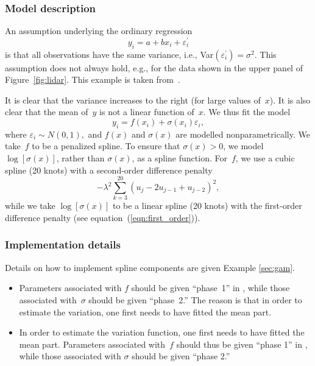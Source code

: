 \documentclass{admbmanual}
\newcommand{\citeasnoun}{\cite}
\begin{document}
\subsubsection{Model description}
An assumption underlying the ordinary regression 
\[
y_{i}=a+bx_{i}+\varepsilon _{i}^{\prime }
\]
is that all observations have the same variance, 
i.e., Var$\left( \varepsilon_{i}^{\prime }\right) =\sigma^{2}$. 
This assumption does not always hold,
e.g., for the data shown in the upper panel of Figure~\ref{fig:lidar}. 
This example is taken from~\citeasnoun{rupp:wand:carr:2003}.

It is clear that the variance increases to the right (for large values of~$x$). It is also clear
that the mean of~$y$ is not a linear function of~$x$. We thus fit the model
\[
y_{i}=f(x_{i})+\sigma (x_{i})\varepsilon _{i},
\]
where $\varepsilon _{i}\sim N(0,1),$ and $f(x)$ and $\sigma (x)$ are
modelled nonparametrically. We take~$f$ to be a
penalized spline. To ensure that $\sigma (x)>0$, we model $\log \left[ \sigma
(x)\right] $, rather than $\sigma (x)$, as a spline function. For~$f$, we use
a cubic spline (20 knots) with a second-order difference penalty%
\[
-\lambda ^{2}\sum_{k=3}^{20}\left( u_{j}-2u_{j-1}+u_{j-2}\right) ^{2},
\]
while we take $\log \left[ \sigma (x)\right]$ to be a linear spline (20
knots) with the first-order difference penalty (see equation~(\ref{eqn:first_order})).


\subsubsection{Implementation details}

Details on how to implement spline components are given Example \ref{sec:gam}.

\begin{itemize}
  \item Parameters associated with $f$ should be given ``phase~1'' in \scAB, while
those associated with~$\sigma $ should be given ``phase~2.'' The reason is
that in order to estimate the variation, one first needs to have fitted the
mean part. 

  \item In order to estimate the variation function, one first needs to have
  fitted the mean part. Parameters associated with~$f$ should thus be given
  ``phase 1'' in \scAB, while those associated with $\sigma$ should be given ``phase
  2.''
\end{itemize}
\end{document}
